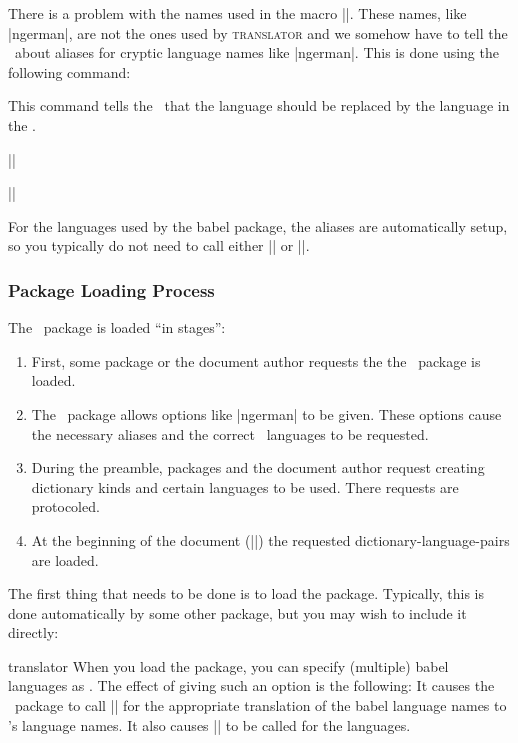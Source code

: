 There is a problem with the names used in the macro |\languagename|. These names, like |ngerman|, are not the ones used by \textsc{translator} and we somehow have to tell the \translatorname\ about aliases for cryptic language names like |ngerman|. This is done using the following command:

\begin{command}{\languagealias{}}
  This command tells the \translatorname\ that the language  should be replaced by the language in the .

  \example
  ||

  \example
  ||
\end{command}

For the languages used by the babel package, the aliases are automatically setup, so you typically do not need to call either |\languagepath| or |\languagealias|.

\subsubsection{Package Loading Process}

The \translatorname\ package is loaded ``in stages'':
\begin{enumerate}
\item
  First, some package or the document author requests the the \translatorname\ package is loaded.
\item
  The \translatorname\ package allows options like |ngerman| to be given. These options cause the necessary aliases and the correct \translatorname\ languages to be requested.
\item
  During the preamble, packages and the document author request creating dictionary kinds and certain languages to be used. There requests are protocoled.
\item
  At the beginning of the document (||) the requested dictionary-language-pairs are loaded.
\end{enumerate}

The first thing that needs to be done is to load the package. Typically, this is done automatically by some other package, but you may wish to include it directly:

\begin{package}{{translator}}
  When you load the package, you can specify (multiple) babel languages as . The effect of giving such an option is the following: It causes the \translatorname\ package to call |\uselanguage| for the appropriate translation of the babel language names to \translatorname's language names. It also causes |\languagealias| to be called for the languages.
\end{package}
